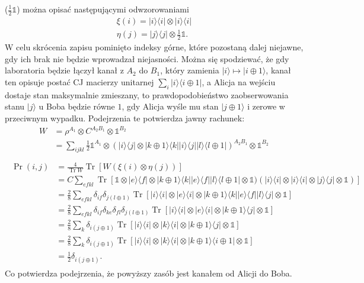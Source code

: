 \documentclass[10pt]{article} %
\DeclareMathOperator{\Trs}{Tr}
\newcommand{\Ket}[1]{|#1\rangle}
\newcommand{\Bra}[1]{\langle#1|}
\newcommand{\I}{\mathbb{1}}
\begin{document}
($\frac{1}{2}\I$) można opisać następującymi odwzorowaniami
\begin{gather}
\xi(i) = \Ket{i}\Bra{i} \otimes \Ket{i}\Bra{i} \\
\eta(j) = \Ket{j}\Bra{j} \otimes \frac{1}{2}\I.
\end{gather} 
W celu skrócenia zapisu pominięto indeksy górne, które pozostaną dalej niejawne, gdy ich brak nie będzie wprowadzał niejasności.
Można się spodziewać, że gdy laboratoria będzie łączył kanał z $A_2$ do $B_1$, który zamienia $\Ket{i} \mapsto \Ket{i \oplus 1}$, kanał ten opisuje postać CJ macierzy unitarnej $\sum_i \Ket{i}\Bra{i \oplus 1}$, a Alicja na wejściu dostaje stan maksymalnie zmieszany, to prawdopodobieństwo
zaobserwowania stanu $\Ket{j}$ u Boba będzie równe $1$, gdy Alicja wyśle mu stan $\Ket{j \oplus 1}$ i zerowe w przeciwnym wypadku. Podejrzenia te potwierdza jawny rachunek:
\begin{equation}
\begin{split}
W &= \rho^{A_1} \otimes C^{A_2B_1} \otimes \I^{B_2} \\&= \sum_{ijkl} \frac{1}{2}\I^{A_1} \otimes\left( \Ket{i}\Bra{j} \otimes \Ket{k\oplus 1}\Bra{k} \Ket{i}\Bra{j} \Ket{l}\Bra{l \oplus 1}\right)^{A_2B_1} \otimes \I^{B_2} \\
\end{split}
\end{equation}
\begin{gather}
\begin{split}
\Pr(i,j) &= \frac{4}{\Trs W} \Trs\left[ W (\xi(i) \otimes \eta(j))\right]\\&=C \sum_{efkl} \Trs [\I \otimes \Ket{e}\Bra{f} \otimes \Ket{k\oplus 1}\Bra{k} \Ket{e}\Bra{f} \Ket{l}\Bra{l \oplus 1} \otimes \I)(\Ket{i}\Bra{i} \otimes \Ket{i}\Bra{i} \otimes \Ket{j}\Bra{j} \otimes \I)] \\
&= \frac{2}{8} \sum_{efkl} \delta_{if} \delta_{j(l \oplus 1)} \Trs \left[ \Ket{i}\Bra{i} \otimes \Ket{e}\Bra{i} \otimes \Ket{k \oplus 1}\Bra{k}\Ket{e}\Bra{f}\Ket{l}\Bra{j} \otimes \I \right] \\
&= \frac{2}{8} \sum_{efkl} \delta_{if} \delta_{ke} \delta_{fl} \delta_{j(l \oplus 1)} \Trs \left[ \Ket{i}\Bra{i} \otimes \Ket{e}\Bra{i} \otimes \Ket{k \oplus 1} \Bra{j} \otimes \I\right] \\
&= \frac{2}{8} \sum_{k} \delta_{i(j \oplus 1)} \Trs \left[ \Ket{i}\Bra{i} \otimes \Ket{k}\Bra{i} \otimes \Ket{k \oplus 1}\Bra{j} \otimes \I \right]  \\
&= \frac{2}{8} \sum_k \delta_{i(j \oplus 1)} \Trs \left[ \Ket{i}\Bra{i} \otimes \Ket{k}\Bra{i} \otimes \Ket{k \oplus 1}\Bra{i \oplus 1} \otimes  \I\right] \\
&=  \frac{1}{2} \delta_{i(j \oplus 1)}.
\end{split} 
\end{gather}  Co potwierdza podejrzenia, że powyższy zasób jest kanałem od Alicji do Boba.
\end{document}

